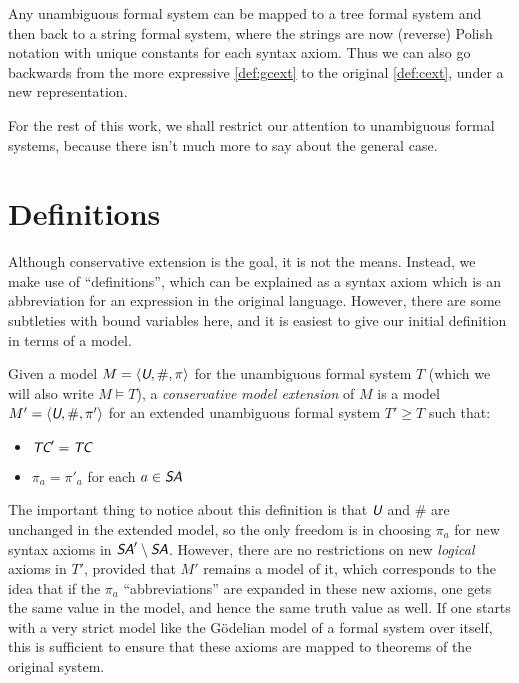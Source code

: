 \documentclass[runningheads,a4paper]{llncs}
\newcommand{\tc}{\textit{\textsf{TC}}} %
\newcommand{\uv}{\textit{\textsf{U}}} %
\newcommand{\sa}{\textit{\textsf{SA}}} %
\newcommand{\ang}[1]{\langle#1\rangle}
\newcommand{\fresh}{\mathbin{\#}}
\begin{document}
\begin{remark}
Any unambiguous formal system can be mapped to a tree formal system and then back to a string formal system, where the strings are now (reverse) Polish notation with unique constants for each syntax axiom. Thus we can also go backwards from the more expressive \autoref{def:gcext} to the original \autoref{def:cext}, under a new representation.
\end{remark}

For the rest of this work, we shall restrict our attention to unambiguous formal systems, because there isn't much more to say about the general case.

\section{Definitions}\label{sec:definition}
Although conservative extension is the goal, it is not the means. Instead, we make use of ``definitions'', which can be explained as a syntax axiom which is an abbreviation for an expression in the original language. However, there are some subtleties with bound variables here, and it is easiest to give our initial definition in terms of a model.

\begin{definition}
Given a model $M=\ang{\uv,\fresh,\pi}$ for the unambiguous formal system $T$ (which we will also write $M\models T$), a {\em conservative model extension} of $M$ is a model $M'=\ang{\uv,\fresh,\pi'}$ for an extended unambiguous formal system $T'\ge T$ such that:
\begin{itemize}
  \item $\tc'=\tc$
  \item $\pi_a=\pi'_a$ for each $a\in\sa$
\end{itemize}
\end{definition}

The important thing to notice about this definition is that $\uv$ and $\fresh$ are unchanged in the extended model, so the only freedom is in choosing $\pi_a$ for new syntax axioms in $\sa'\setminus\sa$. However, there are no restrictions on new {\em logical} axioms in $T'$, provided that $M'$ remains a model of it, which corresponds to the idea that if the $\pi_a$ ``abbreviations'' are expanded in these new axioms, one gets the same value in the model, and hence the same truth value as well. If one starts with a very strict model like the G\"{o}delian model of a formal system over itself, this is sufficient to ensure that these axioms are mapped to theorems of the original system.
\end{document}

